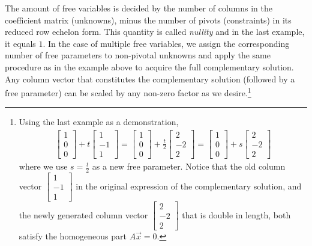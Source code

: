 The amount of free variables is decided by the number of columns in the coefficient matrix (unknowns), minus the number of pivots (constraints) in its reduced row echelon form. This quantity is called \textit{nullity} and in the last example, it equals $1$. In the case of multiple free variables, we assign the corresponding number of free parameters to non-pivotal unknowns and apply the same procedure as in the example above to acquire the full complementary solution. Any column vector that constitutes the complementary solution (followed by a free parameter) can be scaled by any non-zero factor as we desire.\footnote{Using the last example as a demonstration, 
\begin{align*}
\begin{bmatrix}
1 \\
0 \\
0
\end{bmatrix}
+ t
\begin{bmatrix}
1 \\
-1 \\
1
\end{bmatrix}
=
\begin{bmatrix}
1 \\
0 \\
0
\end{bmatrix}
+ \frac{t}{2}
\begin{bmatrix}
2 \\
-2 \\
2
\end{bmatrix}
=
\begin{bmatrix}
1 \\
0 \\
0
\end{bmatrix}
+ s
\begin{bmatrix}
2 \\
-2 \\
2
\end{bmatrix}
\end{align*} where we use $s = \frac{t}{2}$ as a new free parameter. Notice that the old column vector $\begin{bmatrix}
1 \\
-1 \\
1
\end{bmatrix}$ in the original expression of the complementary solution, and the newly generated column vector $\begin{bmatrix}
2 \\
-2 \\
2
\end{bmatrix}$ that is double in length, both satisfy the homogeneous part $A\vec{x} = 0$.} \par
